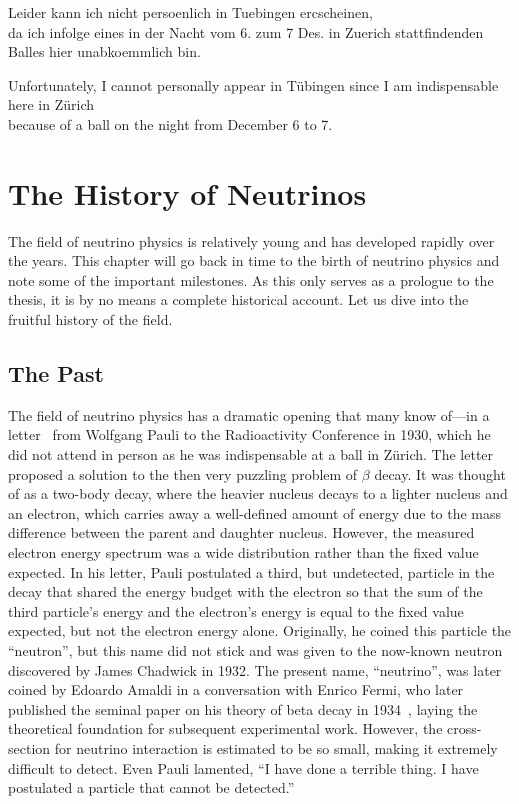 \begin{savequote}[8cm]
Leider kann ich nicht persoenlich in Tuebingen ercscheinen, \\
da ich infolge eines in der Nacht vom 6. zum 7 Des. in Zuerich stattfindenden Balles hier unabkoemmlich bin.

  Unfortunately, I cannot personally appear in Tübingen since I am indispensable here in Zürich \\ because of a ball on the night from December 6 to 7.

\end{savequote}

\chapter{\label{ch:nu-hist}The History of Neutrinos}
\minitoc

The field of neutrino physics is relatively young and has developed rapidly over the years.
This chapter will go back in time to the birth of neutrino physics and note some of the important milestones.
As this only serves as a prologue to the thesis, it is by no means a complete historical account.
Let us dive into the fruitful history of the field.

\section{The Past}
The field of neutrino physics has a dramatic opening that many know of—in a letter~\cite{Pauli:1930pc} from Wolfgang Pauli to the Radioactivity Conference in 1930, which he did not attend in person as he was indispensable at a ball in Zürich. 
The letter proposed a solution to the then very puzzling problem of $\beta$ decay.
It was thought of as a two-body decay, where the heavier nucleus decays to a lighter nucleus and an electron, which carries away a well-defined amount of energy due to the mass difference between the parent and daughter nucleus.  
However, the measured electron energy spectrum was a wide distribution rather than the fixed value expected. 
In his letter, Pauli postulated a third, but undetected, particle in the decay that shared the energy budget with the electron so that the sum of the third particle's energy and the electron's energy is equal to the fixed value expected, but not the electron energy alone. 
Originally, he coined this particle the ``neutron'', but this name did not stick and was given to the now-known neutron discovered by James Chadwick in 1932.
The present name, ``neutrino'', was later coined by Edoardo Amaldi in a conversation with Enrico Fermi, who later published the seminal paper on his theory of beta decay in 1934~\cite{Fermi:1934hr}, laying the theoretical foundation for subsequent experimental work.
However, the cross-section for neutrino interaction is estimated to be so small, making it extremely difficult to detect.
Even Pauli lamented, ``I have done a terrible thing. I have postulated a particle that cannot be detected.''

